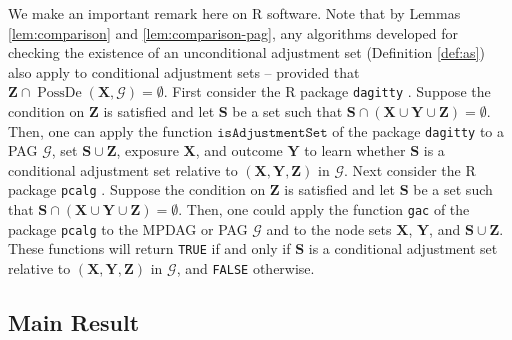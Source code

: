 \documentclass[twoside]{article}
\DeclareMathOperator{\PossDe}{PossDe}
\newcommand{\mb}[1]{\mathbf{#1}}
\newcommand{\g}[1][G]{\mathcal{#1}}
\begin{document}
We make an important remark here on R software. Note that by Lemmas \ref{lem:comparison} and \ref{lem:comparison-pag}, any algorithms developed for checking the existence of an unconditional adjustment set (Definition \ref{def:as}) also apply to conditional adjustment sets -- provided that $\mb{Z} \cap \PossDe(\mb{X}, \g) = \emptyset$. First consider the R package \texttt{dagitty} \citep{textor2016robust}. Suppose the condition on $\mb{Z}$ is satisfied and let $\mb{S}$ be a set such that $\mb{S} \cap (\mb{X} \cup \mb{Y} \cup \mb{Z}) = \emptyset$. Then, one can apply the function $\texttt{isAdjustmentSet}$ of the package \texttt{dagitty} to a PAG $\g$, set $\mb{S} \cup \mb{Z}$, exposure $\mb{X}$, and outcome $\mb{Y}$ to learn whether $\mb{S}$ is a conditional adjustment set relative to $(\mb{X},\mb{Y},\mb{Z})$ in $\g$. Next consider the R package \texttt{pcalg} \citep{kalisch2012pcalg}. Suppose the condition on $\mb{Z}$ is satisfied and let $\mb{S}$ be a set such that $\mb{S} \cap (\mb{X} \cup \mb{Y} \cup \mb{Z}) = \emptyset$. Then, one could apply the function \texttt{gac} of the package \texttt{pcalg} to the MPDAG or PAG $\g$ and to the node sets $\mb{X}$, $\mb{Y}$, and $\mb{S} \cup \mb{Z}$. These functions will return \texttt{TRUE} if and only if $\mb{S}$ is a conditional adjustment set relative to $(\mb{X},\mb{Y},\mb{Z})$ in $\g$, and \texttt{FALSE} otherwise.





\subsection{Main Result}
\end{document}
